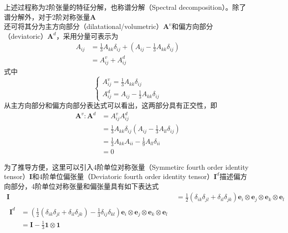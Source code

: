 上述过程称为2阶张量的特征分解，也称谱分解（Spectral decomposition）。除了谱分解外，对于2阶对称张量$\boldsymbol A$还可将其分为主方向部分（dilatational/volumetric）$\boldsymbol A^v$和偏方向部分（deviatoric）$\boldsymbol A^d$，采用分量可表示为
\begin{equation}
    \begin{split}
        A_{ij} &= \frac{1}{3} A_{kk} \delta_{ij} + (A_{ij} - \frac{1}{3} A_{kk} \delta_{ij}) \\
               &= A_{ij}^v + A_{ij}^d
    \end{split}
\end{equation}
式中
\begin{equation}\label{ch_introduction:decompose}
    \begin{cases}
        A_{ij}^v = \frac{1}{3} A_{kk} \delta_{ij} \\
        A_{ij}^d = A_{ij} - \frac{1}{3} A_{kk} \delta_{ij}
    \end{cases}
\end{equation}
从主方向部分和偏方向部分表达式可以看出，这两部分具有正交性，即
\begin{equation}
    \begin{split}
        \boldsymbol A^v : \boldsymbol A^d &= A_{ij}^v A_{ij}^d \\
                                          &= \frac{1}{3} A_{kk} \delta_{ij} (A_{ij} - \frac{1}{3} A_{ll} \delta_{ij}) \\
                                          &= \frac{1}{3} A_{kk} A_{ii}  - \frac{1}{9} A_{ll} \delta_{ii} \\
                                          &= 0
    \end{split}
\end{equation}\par
为了推导方便，这里可以引入4阶单位对称张量（Symmetirc fourth order identity tensor）$\boldsymbol I$和4阶单位偏张量（Deviatoric fourth order identity tensor）$\boldsymbol I^d$描述偏方向部分，4阶单位对称张量和偏张量具有如下表达式
\begin{align}
    \boldsymbol I &= \frac{1}{2}(\delta_{ik} \delta_{jl} + \delta_{il} \delta_{jk}) \boldsymbol e_i \otimes \boldsymbol e_j \otimes \boldsymbol e_k \otimes \boldsymbol e_l \\
    \begin{split}
        \boldsymbol I^d &= (\frac{1}{2}(\delta_{ik} \delta_{jl} + \delta_{il} \delta_{jk})-\frac{1}{3}\delta_{ij}\delta_{kl}) \boldsymbol e_i \otimes \boldsymbol e_j \otimes \boldsymbol e_k \otimes \boldsymbol e_l \\
                        &= \boldsymbol I - \frac{1}{3} \boldsymbol 1 \otimes \boldsymbol 1
    \end{split}
\end{align}
